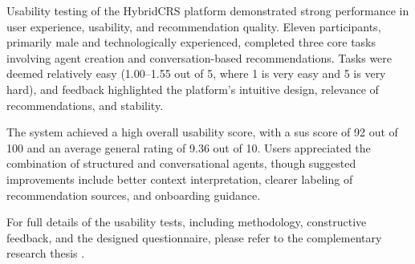 Usability testing of the HybridCRS platform demonstrated strong performance in user experience, usability, and recommendation quality. Eleven participants, primarily male and technologically experienced, completed three core tasks involving agent creation and conversation-based recommendations. Tasks were deemed relatively easy (1.00–1.55 out of 5, where 1 is very easy and 5 is very hard), and feedback highlighted the platform's intuitive design, relevance of recommendations, and stability.

The system achieved a high overall usability score, with a \ac{sus} \cite{SUS} score of 92 out of 100 and an average general rating of 9.36 out of 10. Users appreciated the combination of structured and conversational agents, though suggested improvements include better context interpretation, clearer labeling of recommendation sources, and onboarding guidance.

For full details of the usability tests, including methodology, constructive feedback, and the designed questionnaire, please refer to the complementary research thesis \cite{MUI2ICSI-THESIS}.